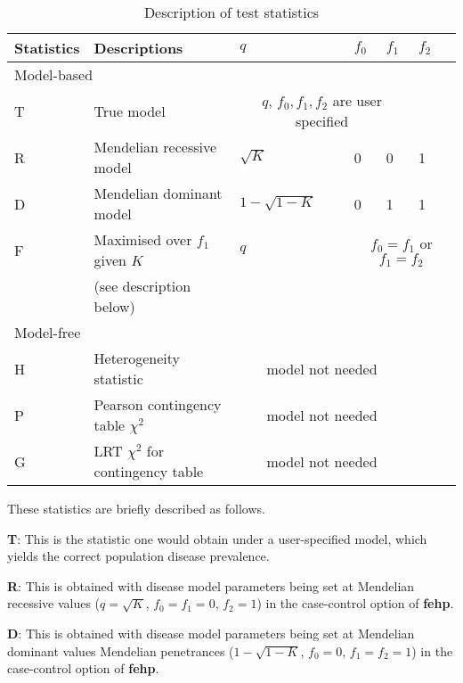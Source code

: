 \begin{table}[h]\centering
\caption{Description of test statistics\label{brief}}
\begin{tabular}{llllllll}
\\
\hline
Statistics & Descriptions & $q$ && $f_0$&$f_1$&$f_2$\\
\hline
\multicolumn{2}{l}{Model-based}\\
T & True model & \multicolumn{4}{c}{$q$, $f_0, f_1, f_2$ are user specified}\\
R & Mendelian recessive model & $\sqrt{K}$&&0&0&1\\
D & Mendelian dominant model & $1-\sqrt{1-K}$&&0&1&1\\
F & Maximised over $f_1$ given $K$ &$q$ &&\multicolumn{4}{c}{$f_0=f_1$ or $f_1=f_2$}\\
  & (see description below)\\
\multicolumn{2}{l}{Model-free}\\
H & Heterogeneity statistic& \multicolumn{4}{c}{model not needed}\\
P & Pearson contingency table $\chi^2$&\multicolumn{4}{c}{model not needed}\\
G & LRT $\chi^2$ for contingency table&\multicolumn{4}{c}{model not needed}\\
\hline
\end{tabular}

\end{table}

These statistics are briefly described as follows.

{\bf T}:  This is the statistic one would obtain under a user-specified model,
which yields the correct population disease prevalence.

{\bf R}:  This is obtained with disease model parameters being set at Mendelian
recessive values ($q=\sqrt{K}$, $f_0=f_1=0$, $f_2=1$) in the case-control
option of {\bf fehp}.

{\bf D}:  This is obtained with disease model parameters being set at Mendelian
dominant values Mendelian penetrances ($1-\sqrt{1-K}$, $f_0=0$, $f_1=f_2=1$) in
the case-control option of {\bf fehp}.

